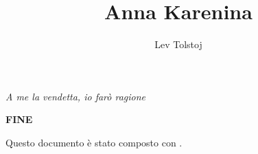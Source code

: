 \documentclass{scrbook}
\title{Anna Karenina}
\author{Lev Tolstoj}
\date{}
\begin{document}

\begin{titlepage}
\begin{center}
\pagecolor{rosso}\afterpage{\nopagecolor}
\color{panna}
{\sffamily
\vspace*{\fill}
\newline
\vspace*{5pt}
}
\color{giallo}
\vspace*{5pt}
\end{center}
\end{titlepage}
\restoregeometry

\cleardoublepage

\pagestyle{empty}
\vspace*{\fill}
\begin{flushright}\emph{A me la vendetta, io farò ragione}\end{flushright}
\vspace*{\fill}
\cleardoublepage
\thispagestyle{empty}
\tableofcontents
\cleardoublepage



%








\vspace*{\fill}
\begin{center}\sffamily\textbf{FINE}\end{center}
\vspace*{\fill}


\cleardoublepage

\vspace*{\fill}
\begin{center}\sffamily Questo documento è stato composto con .\end{center}

\cleardoublepage

\pagecolor{rosso}\null\thispagestyle{empty}

\end{document}

